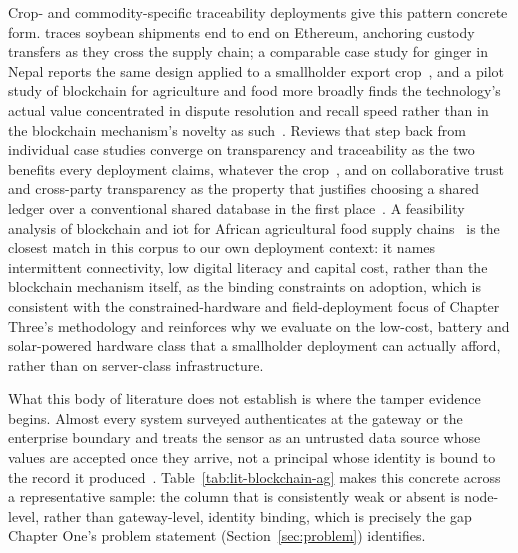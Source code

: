 \documentclass[12pt,a4paper,oneside]{book}
\begin{document}
Crop- and commodity-specific traceability deployments give this pattern
concrete form. \textcite{salah2019blockchain} traces soybean shipments end
to end on Ethereum, anchoring custody transfers as they cross the supply
chain; a comparable case study for ginger in Nepal reports the same
design applied to a smallholder export
crop~\cite{anonndblockchainbased}, and a pilot study of blockchain for
agriculture and food more broadly finds the technology's actual value
concentrated in dispute resolution and recall speed rather than in the
blockchain mechanism's novelty as such~\cite{liu2021traceableSupply}.
Reviews that step back from individual case studies converge on
transparency and traceability as the two benefits every deployment claims,
whatever the crop~\cite{anonndblockchaintechnology2}, and on collaborative
trust and cross-party transparency as the property that justifies choosing
a shared ledger over a conventional shared database in the first
place~\cite{kumar2024collaborativenetworks}. A feasibility analysis of
blockchain and \gls{iot} for African agricultural food supply
chains~\cite{tang2024feasibility} is the closest match in this corpus to
our own deployment context: it names intermittent connectivity, low
digital literacy and capital cost, rather than the blockchain mechanism
itself, as the binding constraints on adoption, which is consistent with
the constrained-hardware and field-deployment focus of Chapter Three's
methodology and reinforces why we evaluate on the low-cost, battery and
solar-powered hardware class that a smallholder deployment can actually
afford, rather than on server-class infrastructure.

What this body of literature does not establish is where the tamper
evidence begins. Almost every system surveyed authenticates at the gateway
or the enterprise boundary and treats the sensor as an untrusted data
source whose values are accepted once they arrive, not a principal whose
identity is bound to the record it produced~\cite{lin2020blockchain, ferrag2020blockchain, kamilaris2019rise, ali2023farmDataTampering}. Table~\ref{tab:lit-blockchain-ag} makes this
concrete across a representative sample: the column that is consistently
weak or absent is node-level, rather than gateway-level, identity binding,
which is precisely the gap Chapter One's problem statement
(Section~\ref{sec:problem}) identifies.
\end{document}
